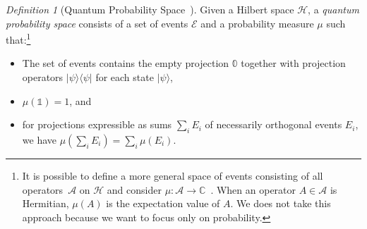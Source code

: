 \documentclass{article}
\theoremstyle{remark}
\newtheorem{definition}{Definition}
\newcommand{\events}{\ensuremath{\mathcal{E}}}
\newcommand{\Hilb}{\mathcal{H}}
\newcommand{\ket}[1]{|#1\rangle}
\newcommand{\proj}[1]{|#1 \rangle\langle #1 |}
\newcommand{\amr}[1]{\fbox{\begin{minipage}{0.9\textwidth}\color{green}{Amr says: #1}\end{minipage}}}
\def\C{{\mathbb{C}}}
\begin{document}
\begin{definition}[Quantum Probability Space~\cite{BirkhoffVonNeumann1936,gleason1957,Redhead1987-REDINA,DBLP:journals/corr/abs-0910-2393,Maassen2010}]
  Given a Hilbert space $\Hilb$, a \emph{quantum probability space}
  consists of a set of events $\events$ and a probability measure
  $\mu$ such that:\footnote {It is possible to define a more general
    space of events consisting of all operators~$\mathcal{A}$ on
    $\Hilb$ and consider
    $\mu:\mathcal{A}\rightarrow\C$~\cite{Maassen2010,Swart2013}.  When
    an operator $A\in\mathcal{A}$ is Hermitian, $\mu\left(A\right)$ is
    the expectation value of $A$. We does not take this approach
    because we want to focus only on probability. }
\begin{itemize}
\item The set of events contains the empty projection $\mathbb{0}$
  together with projection operators $\proj{\psi}$ for each state
  $\ket{\psi}$,
\item $\mu(\mathbb{1})=1$, and 
\item for projections expressible as sums $\sum_{i}E_{i}$ of
  necessarily orthogonal events $E_i$, we have
  $\mu\left(\sum_{i}E_{i}\right)=\sum_{i}\mu\left(E_{i}\right)$.
\end{itemize}
\end{definition}

\newpage
\amr{the rest needs cleaning up and perhaps does not even belong in
  this section}
\end{document}
